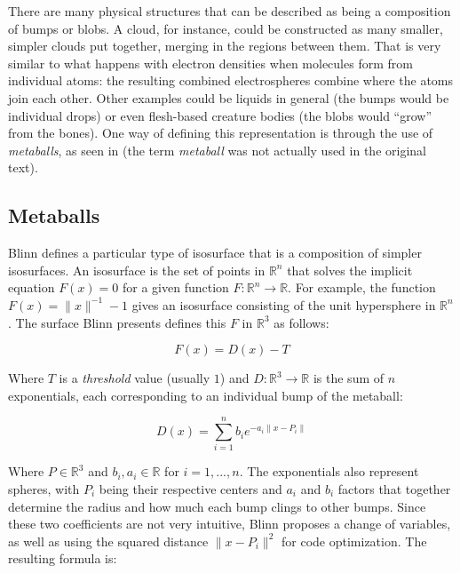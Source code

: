 \documentclass[conference]{acmsiggraph}
\begin{document}
There are many physical structures that can be described as being a composition
of bumps or blobs. A cloud, for instance, could be constructed as many smaller,
simpler clouds put together, merging in the regions between them. That is very
similar to what happens with electron densities when molecules form from
individual atoms: the resulting combined electrospheres combine where the atoms
join each other. Other examples could be liquids in general (the bumps would be
individual drops) or even flesh-based creature bodies (the blobs would ``grow''
from the bones). One way of defining this representation is through the use of
\textit{metaballs}, as seen in \cite{Blinn:1982:GAS:965145.801290} (the term
\textit{metaball} was not actually used in the original text).

\subsection{Metaballs}

Blinn  defines a particular type of
isosurface that is a composition of simpler isosurfaces. An isosurface is the
set of points in $\mathbb{R}^n$ that solves the implicit equation
$F(x) = 0$ for a given function $F:\mathbb{R}^n \rightarrow \mathbb{R}$. For
example, the function $F(x) = \|x\|^{-1} - 1$ gives an isosurface
consisting of the unit hypersphere in $\mathbb{R}^n$. The surface Blinn presents
defines this $F$ in $\mathbb{R}^3$ as follows:

\begin{equation}
  F(x) = D(x) - T
\end{equation}

Where $T$ is a \textit{threshold} value (usually $1$) and
$D:\mathbb{R}^3 \rightarrow \mathbb{R}$ is the sum of $n$ exponentials, each
corresponding to an individual bump of the metaball:

\begin{equation}
  D(x) = \sum_{i=1}^{n} b_i e^{-a_i \|x-P_i\|}
\end{equation}

Where $P\in\mathbb{R}^3$ and $b_i,a_i\in\mathbb{R}$ for $i=1,...,n$. The
exponentials also represent spheres, with $P_i$ being their respective centers
and $a_i$ and $b_i$ factors that together determine the radius and how much each
bump clings to other bumps. Since these two coefficients are not very intuitive,
Blinn proposes a change of variables, as well as using the squared distance
$\|x-P_i\|^2$ for code optimization. The resulting formula is:
\end{document}
